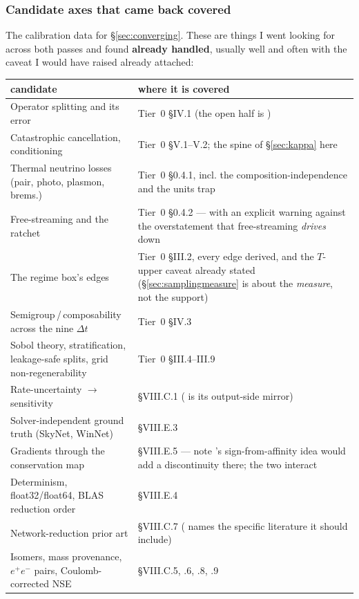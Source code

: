 \subsubsection{Candidate axes that came back covered}
\label{sec:coveredaxes}

The calibration data for \S\ref{sec:converging}. These are things I went looking
for across both passes and found \textbf{already handled}, usually well and
often with the caveat I would have raised already attached:

\begin{center}
\begin{tabularx}{\textwidth}{@{}L{5.6cm} Y@{}}
\toprule
\textbf{candidate} & \textbf{where it is covered} \\
\midrule
Operator splitting and its error &
  Tier~0 \S IV.1 (the open half is ) \\
Catastrophic cancellation, conditioning &
  Tier~0 \S V.1--V.2; the spine of \S\ref{sec:kappa} here \\
Thermal neutrino losses (pair, photo, plasmon, brems.) &
  Tier~0 \S0.4.1, incl. the composition-independence and the units trap \\
Free-streaming and the \Ye{} ratchet &
  Tier~0 \S0.4.2 --- with an explicit warning against the overstatement that
  free-streaming \emph{drives} \Ye{} down \\
The regime box's edges &
  Tier~0 \S III.2, every edge derived, and the $T$-upper caveat already stated
  (\S\ref{sec:samplingmeasure} is about the \emph{measure}, not the support) \\
Semigroup\,/\,composability across the nine $\Delta t$ & Tier~0 \S IV.3 \\
Sobol theory, stratification, leakage-safe splits, grid non-regenerability &
  Tier~0 \S III.4--III.9 \\
Rate-uncertainty $\to$ \Ye{} sensitivity &
   \S VIII.C.1 ( is its output-side mirror) \\
Solver-independent ground truth (SkyNet, WinNet) &
   \S VIII.E.3 \\
Gradients through the conservation map &
   \S VIII.E.5 --- note 's sign-from-affinity idea
  would add a discontinuity there; the two interact \\
Determinism, float32/float64, BLAS reduction order &
   \S VIII.E.4 \\
Network-reduction prior art &
   \S VIII.C.7 ( names the specific literature it
  should include) \\
Isomers, mass provenance, $e^+e^-$ pairs, Coulomb-corrected NSE &
   \S VIII.C.5, .6, .8, .9 \\
\bottomrule
\end{tabularx}
\end{center}

